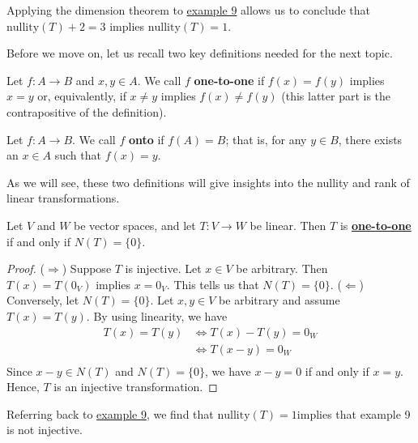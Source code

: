 Applying the dimension theorem to {\hyperref[Example 9]{example 9}} allows us to conclude that
\( \text{nullity}(T) + 2 = 3   \) implies \( \text{nullity}(T) = 1  \).


Before we move on, let us recall two key definitions needed for the next topic.

\begin{definition}\label{One-to-one}
    Let \( f: A \to B  \) and \( x,y \in A  \). We call \( f \) \textbf{one-to-one} if \( f(x) = f(y)  \) implies \( x = y  \) or, equivalently, if \( x \neq y  \) implies \( f(x) \neq f(y) \) (this latter part is the contrapositive of the definition).
\end{definition}

\begin{definition}
    Let \( f: A \to B  \). We call \( f \) \textbf{onto} if \( f(A) = B  \); that is, for any \( y \in B  \), there exists an \( x \in A  \) such that \( f(x) = y  \).
\end{definition}

As we will see, these two definitions will give insights into the nullity and rank of linear transformations.

\begin{theorem}\label{Theorem 2.5}
   Let \( V  \) and \( W  \) be vector spaces, and let \( T: V \to W  \) be linear. Then \( T   \) is {\hyperref[One-to-one]{\textbf{one-to-one}}} if and only if \( N(T) = \{ 0 \}  \).  
\end{theorem}
\begin{proof}
    (\( \Rightarrow \)) Suppose \( T  \) is injective. Let \( x \in V  \) be arbitrary. Then \( T(x) = T(0_{V})  \) implies \( x = 0_{V} \). This tells us that \( N(T) = \{ 0 \}   \).
    (\( \Leftarrow \)) Conversely, let \( N(T) = \{ 0 \}  \). Let \( x,y \in V  \) be arbitrary and assume \( T(x) = T(y)  \). By using linearity, we have
    \begin{align*}
        T(x) = T(y) &\iff T(x) - T(y) = 0_{W} \\
                    &\iff T(x-y) = 0_{W} \\
    \end{align*}
    Since \( x - y \in N(T)  \) and \( N(T) = \{ 0 \}  \), we have \( x - y = 0  \) if and only if \( x = y  \). Hence, \( T  \) is an injective transformation.
\end{proof}

Referring back to {\hyperref[Example 9]{example 9}}, we find that \( \text{nullity}(T) = 1  \)implies that example 9 is not injective.

